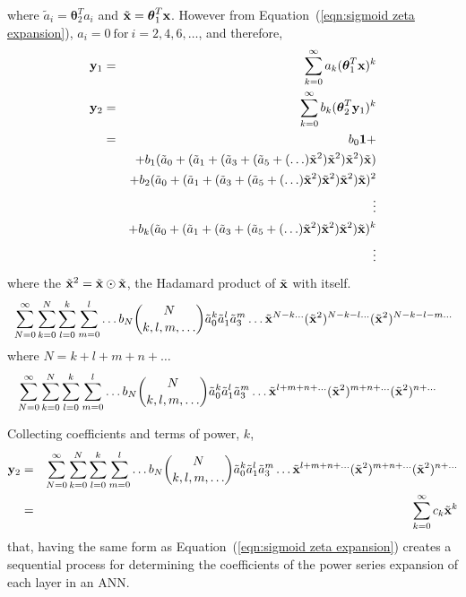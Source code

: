 \noindent where $\tilde a_i = \boldsymbol\theta_2^T a_i$ and $\tilde{\bold x} = \boldsymbol\theta_1^T {\bold x}$. However from Equation~(\ref{eqn:sigmoid zeta expansion}), $a_i  = 0\ \text{for}\ i = 2, 4, 6, \ldots$, and therefore,
\begin{eqnarray}
	{\bold y}_1 & = & \sum_{k=0}^\infty a_k (\boldsymbol\theta_1^T {\bold x})^k \nonumber \\
	{\bold y}_2 & = & \sum_{k=0}^\infty b_k (\boldsymbol\theta_2^T {\bold y}_1)^k \nonumber \\
		& = & b_0 {\bold 1} + \nonumber\\
		&   & + b_1 (\tilde a_0 +%
					(\tilde a_1 + %
						(\tilde a_3 + %
							(\tilde a_5 + %
								(\ldots) \tilde {\bold x}^2 )%
							\tilde {\bold x}^2 )%
						\tilde {\bold x}^2 )%
					\tilde {\bold x}) \nonumber \\
		&   & + b_2 (\tilde a_0 +%
					(\tilde a_1 + %
						(\tilde a_3 + %
							(\tilde a_5 + %
								(\ldots) \tilde {\bold x}^2 )%
							\tilde {\bold x}^2 )%
						\tilde {\bold x}^2 )%
					\tilde {\bold x})^2 \nonumber \\
		&   & \vdots \nonumber \\
		&   & + b_k (\tilde a_0 +%
					(\tilde a_1 + %
						(\tilde a_3 + %
							(\tilde a_5 + %
								(\ldots) \tilde {\bold x}^2 )%
							\tilde {\bold x}^2 )%
						\tilde {\bold x}^2 )%
					\tilde {\bold x})^k \nonumber \\
		&   & \vdots
\end{eqnarray}
\noindent where the $\tilde{\bold x}^2 = \tilde{\bold x} \odot \tilde{\bold x}$, the Hadamard product of $\tilde{\bold x}$ with itself.
\begin{align*}
& \sum_{N=0}^\infty \sum_{k=0}^{N} \sum_{l=0}^{k} \sum_{m=0}^{l} \ldots %
	b_N %
	\binom{N}{k,l,m,\ldots} %
	\tilde a_0^k \tilde a_1^l \tilde a_3^m \ldots %
	\tilde {\bold x}^{N-k\ldots} %
	({\tilde {\bold x}^2})^{N-k-l\ldots} %
	({\tilde {\bold x}^2})^{N-k-l-m\ldots} \\
\end{align*}
\noindent where $N = k+l+m+n+\ldots$
\begin{align*}
& \sum_{N=0}^\infty \sum_{k=0}^{N} \sum_{l=0}^{k} \sum_{m=0}^{l} \ldots %
	b_N %
	\binom{N}{k,l,m,\ldots} %
	\tilde a_0^k \tilde a_1^l \tilde a_3^m \ldots %
	\tilde {\bold x}^{l+m+n+\ldots} %
	({\tilde {\bold x}^2})^{m+n+\ldots} %
	({\tilde {\bold x}^2})^{n+\ldots}
\end{align*}

Collecting coefficients and terms of power, $k$,
\begin{eqnarray*}
{\bold y_2} & = & \sum_{N=0}^\infty \sum_{k=0}^{N} \sum_{l=0}^{k} \sum_{m=0}^{l} \ldots %
	b_N %
	\binom{N}{k,l,m,\ldots} %
	\tilde a_0^k \tilde a_1^l \tilde a_3^m \ldots %
	\tilde {\bold x}^{l+m+n+\ldots} %
	({\tilde {\bold x}^2})^{m+n+\ldots} %
	({\tilde {\bold x}^2})^{n+\ldots} \\
	& = & \sum_{k=0}^\infty c_k \tilde{\bold x}^k %
\end{eqnarray*}
\noindent that, having the same form as Equation~(\ref{eqn:sigmoid zeta expansion}) creates a sequential process for determining the coefficients of the power series expansion of each layer in an ANN.

